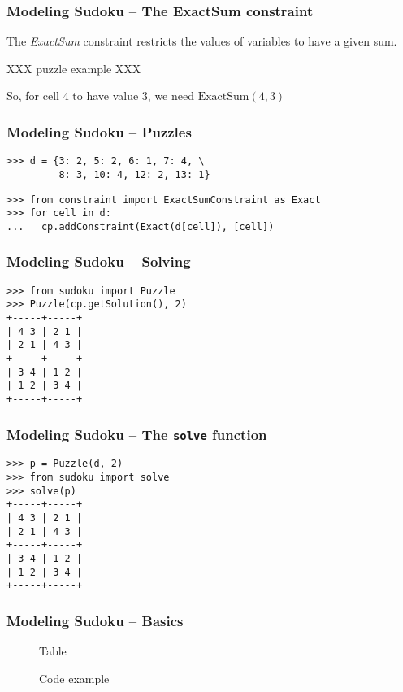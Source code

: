 \documentclass{beamer}
\begin{document}
\begin{frame}[fragile]
\frametitle{Modeling Sudoku -- The ExactSum constraint}

The \emph{ExactSum} constraint restricts the values of variables to have a given sum.

XXX puzzle example XXX

So, for cell 4 to have value 3, we need $\mbox{ExactSum}(4, 3)$

\end{frame}

\begin{frame}[fragile]
\frametitle{Modeling Sudoku -- Puzzles}

\begin{lstlisting}
>>> d = {3: 2, 5: 2, 6: 1, 7: 4, \
         8: 3, 10: 4, 12: 2, 13: 1}
\end{lstlisting}

\begin{lstlisting}
>>> from constraint import ExactSumConstraint as Exact
>>> for cell in d:
...   cp.addConstraint(Exact(d[cell]), [cell])
\end{lstlisting}

\end{frame}

\begin{frame}[fragile]
\frametitle{Modeling Sudoku -- Solving}

\begin{lstlisting}
>>> from sudoku import Puzzle
>>> Puzzle(cp.getSolution(), 2)
+-----+-----+
| 4 3 | 2 1 | 
| 2 1 | 4 3 | 
+-----+-----+
| 3 4 | 1 2 | 
| 1 2 | 3 4 | 
+-----+-----+
\end{lstlisting}
\end{frame}

\begin{frame}[fragile]
\frametitle{Modeling Sudoku -- The \texttt{solve} function}

\begin{lstlisting}
>>> p = Puzzle(d, 2)
>>> from sudoku import solve
>>> solve(p)
+-----+-----+
| 4 3 | 2 1 | 
| 2 1 | 4 3 | 
+-----+-----+
| 3 4 | 1 2 | 
| 1 2 | 3 4 | 
+-----+-----+
\end{lstlisting}

\end{frame}


\begin{frame}[fragile]
\frametitle{Modeling Sudoku -- Basics}
 \begin{figure}[h]
  \centering
  \librarytable
  \caption{Table}
 \end{figure} 

 \begin{figure}[h]
  \centering
  
  \caption{Code example}
 \end{figure} 
\end{frame}
\end{document}
